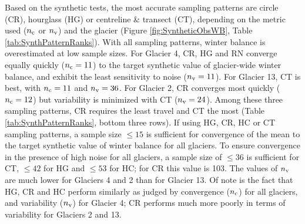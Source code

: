 \documentclass[twocolumn,letterpaper]{igs}
\begin{document}
Based on the synthetic tests, the most accurate sampling patterns are circle (CR), hourglass (HG) or centreline \& transect (CT), depending on the metric used ($n_{\rm c}$ or $n_{\rm v}$) and the glacier (Figure \ref{fig:SyntheticObsWB}, Table \ref{tab:SynthPatternRanks}). 
With all sampling patterns, winter balance is overestimated at low sample sizes.
For Glacier 4, CR, HG and RN converge equally quickly ($n_{\rm c}=11$) to the target synthetic value of glacier-wide winter balance, and exhibit the least sensitivity to noise ($n_{\rm v}=11$). For Glacier 13, CT is best, with $n_{\rm c}=11$ and $n_{\rm v}=36$. For Glacier 2, CR converges most quickly ($n_{\rm c}=12$) but variability is minimized with CT ($n_{\rm v}=24$). Among these three sampling patterns, CR requires the least travel and CT the most (Table \ref{tab:SynthPatternRanks}, bottom three rows). 
If using HG, CR, HC or CT sampling patterns, a sample size $\leq 15$ is sufficient for convergence of the mean to the target synthetic value of winter balance for all glaciers. 
To ensure convergence in the presence of high noise for all glaciers, a sample size of  $\leq 36$ is sufficient for CT, $ \leq 42$ for HG and $\leq 53$ for HC; for CR this value is 103. 
The values of $n_{\rm v}$ are much lower for Glaciers 4 and 2 than for Glacier 13.   
Of note is the fact that HG, CR and HC perform similarly as judged by convergence ($n_{\rm c}$) for all glaciers, and variability ($n_{\rm v}$) for Glacier 4; CR performs much more poorly in terms of variability for Glaciers 2 and 13.
\end{document}
